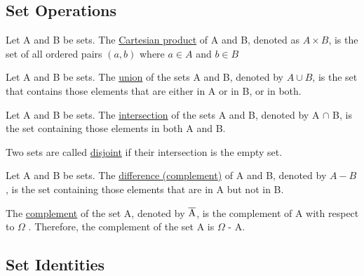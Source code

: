 \documentclass[12pt]{article}
\begin{document}
\quad

\quad

\subsection{Set Operations}

\quad

\noindent Let A and B be sets. The \underline{Cartesian product} of A and B, denoted as $ A \times B $, is the set of all \indent ordered pairs $(a, b)$ where $ a \in A$ and $b \in B$

\quad

\noindent Let A and B be sets. The \underline{union} of the sets A and B, denoted by $A \cup B$, is the set that \indent contains those elements that are either in A or in B, or in both.

\quad

\noindent Let A and B be sets. The \underline{intersection} of the sets A and B, denoted by A $ \cap $ B, is the set \indent containing those elements in both A and B.

\quad

\noindent Two sets are called \underline{disjoint} if their intersection is the empty set.

\quad

\noindent Let A and B be sets. The \underline{difference (complement)} of A and B, denoted by $A - B$, is the set \indent containing those elements that are in A but not in B.

\quad

\noindent The \underline{complement} of the set A, denoted by $\overline{\rm A}$, is the complement of A with respect to $\Omega$ . \indent Therefore, the complement of the set A is $\Omega$ - A.

\quad

\pagebreak

\subsection{Set Identities}
\end{document}
